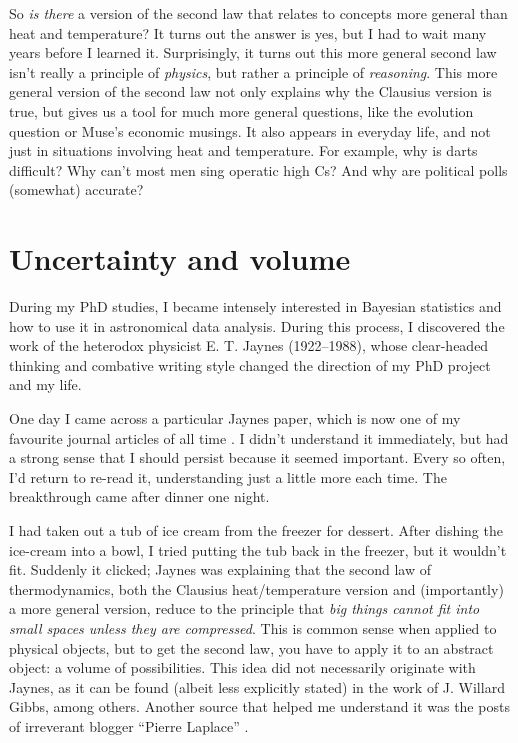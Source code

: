 \documentclass[a4paper, 12pt]{article}
\begin{document}
So {\em is there} a version of the second law that relates to concepts more
general than heat and temperature?
It turns out the answer is yes, but I had to wait many years before I learned it.
Surprisingly, it turns out this more general second law isn't really a
principle of {\em physics}, but rather a
principle of {\em reasoning}. This more general version of the
second law not only explains why the Clausius version is true, but gives us
a tool for much more general questions, like the evolution question or
Muse's economic musings.
It also appears in everyday life, and not just in situations involving heat and
temperature. For example,
why is darts difficult? Why can't most men sing operatic high Cs?
And why are political polls (somewhat) accurate?

\section*{Uncertainty and volume}
During my PhD studies, I became intensely interested in Bayesian statistics
\citep{brewer}
and how to use it in astronomical data analysis. During this process, I
discovered the work of the heterodox physicist E. T. Jaynes \citep{jaynes_site}
(1922--1988), whose clear-headed thinking and combative writing style
changed the direction of my PhD project and my life.

One day I came across a particular Jaynes paper, which is now one of my
favourite journal articles of all time
\citep{jaynes}. I didn't understand it
immediately, but had a strong sense that I should persist because it seemed
important. Every so often, I'd return to re-read it, understanding
just a little more each time. The breakthrough came after dinner one
night.

I had taken out a tub of ice cream from the freezer for dessert. After dishing
the ice-cream into a bowl, I tried putting the tub back in the freezer, but
it wouldn't fit. Suddenly it clicked; Jaynes was explaining that
the second law of thermodynamics, both the Clausius heat/temperature version
and (importantly) a more general version, reduce to the
principle that {\em big things cannot fit into small spaces unless they are
compressed}. This is common sense when applied to physical objects, but to
get the second law, you have to apply it to an abstract object: a volume
of possibilities. This idea did not necessarily originate with Jaynes, as it
can be found (albeit less explicitly stated)
in the work of J. Willard Gibbs, among others. Another source that
helped me understand it was the posts of irreverant blogger ``Pierre Laplace''
\citep{pierre_laplace}.
\end{document}
